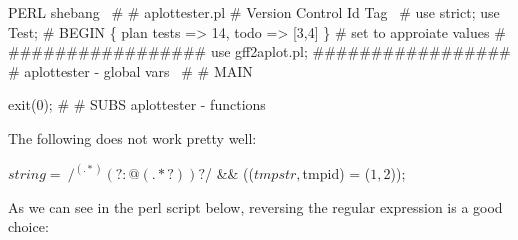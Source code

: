 \documentclass[11pt]{article}
\def\nwendcode{\endtrivlist \endgroup} %
\let\nwdocspar=\par                    %
\begin{document}
\label{todo:TAA}
\nwenddocs{}%
%
%
%
\nwdocspar
\nwenddocs{}%
%
\nwdocspar
\todo{ \item \todoTAA } %


\nwenddocs{}\endmoddef
\LA{}PERL shebang~{\nwtagstyle{}}\RA{}
# 
# aplottester.pl
#
\LA{}Version Control Id Tag~{\nwtagstyle{}}\RA{}
#
use strict;
use Test;
#
BEGIN \{ plan tests => 14, todo => [3,4] \} # set to approiate values
#
#################
use gff2aplot.pl;
#################
#
\LA{}aplottester - global vars~{\nwtagstyle{}}\RA{}
#
# MAIN

exit(0);
#
# SUBS
\LA{}aplottester - functions~{\nwtagstyle{}}\RA{}
\nwendcode{}\nwdocspar


\nwenddocs{}\endmoddef
The following does not work pretty well:

$string =~ /^(.*)(?:@(.*?))?$/ && (($tmpstr, $tmpid) = ($1,$2));

As we can see in the perl script below, reversing the regular expression is a good choice: 
\end{document}
